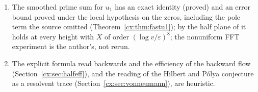 \begin{enumerate}
\item The smoothed prime sum for $u_1$ has an exact identity (proved) and an error bound proved under the local hypothesis on the zeros, including the pole term the source omitted (Theorem~\ref{cx:thm:fastu1}); by the half plane of \cite{OAI26a} it holds at every height with $X$ of order $(\log v/\varepsilon)^8$; the nonuniform FFT experiment is the author's, not rerun.
\item The explicit formula read backwards and the efficiency of the backward flow (Section~\ref{cx:sec:halfeff}), and the reading of the Hilbert and P\'olya conjecture as a resolvent trace (Section~\ref{cx:sec:vonneumann}), are heuristic.
\end{enumerate}
